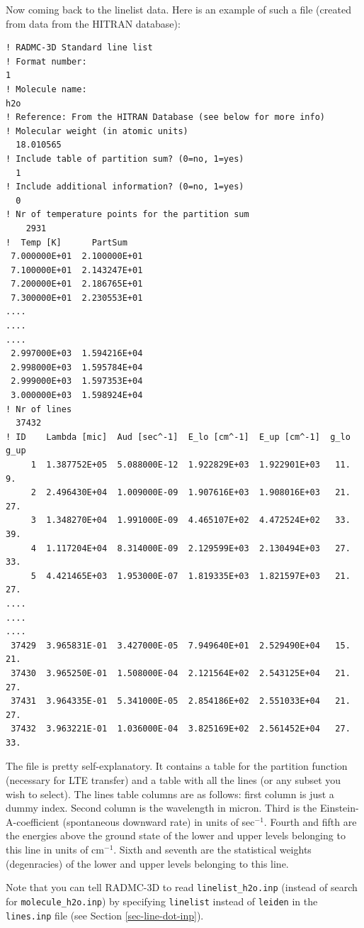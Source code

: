 \documentclass{report}
\newenvironment{asciibox}%
  {\begin{list}{}{%
    \setlength{\topsep}{0.5em}%
    \setlength{\parskip}{0em}%
    \setlength{\parsep}{0em}%
    \setlength{\itemsep}{0em}%
    \setlength{\rightmargin}{0em}%
    \setlength{\leftmargin}{3.0em}%
    \setlength{\labelsep}{1em}%
    \setlength{\labelwidth}{2em}%
  }\normalfont\footnotesize\item}
  {\end{list}}
\begin{document}
Now coming back to the linelist data. Here is an example of such a file
(created from data from the HITRAN database):
\begin{asciibox}\begin{verbatim}
! RADMC-3D Standard line list
! Format number:
1
! Molecule name:
h2o
! Reference: From the HITRAN Database (see below for more info)
! Molecular weight (in atomic units)
  18.010565
! Include table of partition sum? (0=no, 1=yes)
  1
! Include additional information? (0=no, 1=yes)
  0
! Nr of temperature points for the partition sum
    2931
!  Temp [K]      PartSum
 7.000000E+01  2.100000E+01
 7.100000E+01  2.143247E+01
 7.200000E+01  2.186765E+01
 7.300000E+01  2.230553E+01
....
....
....
 2.997000E+03  1.594216E+04
 2.998000E+03  1.595784E+04
 2.999000E+03  1.597353E+04
 3.000000E+03  1.598924E+04
! Nr of lines
  37432
! ID    Lambda [mic]  Aud [sec^-1]  E_lo [cm^-1]  E_up [cm^-1]  g_lo  g_up   
     1  1.387752E+05  5.088000E-12  1.922829E+03  1.922901E+03   11.    9.   
     2  2.496430E+04  1.009000E-09  1.907616E+03  1.908016E+03   21.   27.   
     3  1.348270E+04  1.991000E-09  4.465107E+02  4.472524E+02   33.   39.   
     4  1.117204E+04  8.314000E-09  2.129599E+03  2.130494E+03   27.   33.   
     5  4.421465E+03  1.953000E-07  1.819335E+03  1.821597E+03   21.   27.   
....
....
....
 37429  3.965831E-01  3.427000E-05  7.949640E+01  2.529490E+04   15.   21.   
 37430  3.965250E-01  1.508000E-04  2.121564E+02  2.543125E+04   21.   27.   
 37431  3.964335E-01  5.341000E-05  2.854186E+02  2.551033E+04   21.   27.   
 37432  3.963221E-01  1.036000E-04  3.825169E+02  2.561452E+04   27.   33.   
\end{verbatim}\end{asciibox}
The file is pretty self-explanatory. It contains a table for the partition
function (necessary for LTE transfer) and a table with all the lines (or any
subset you wish to select). The lines table columns are as follows: first
column is just a dummy index. Second column is the wavelength in
micron. Third is the Einstein-A-coefficient (spontaneous downward rate) in
units of sec$^{-1}$. Fourth and fifth are the energies above the ground
state of the lower and upper levels belonging to this line in units of
cm$^{-1}$. Sixth and seventh are the statistical weights (degenracies) of
the lower and upper levels belonging to this line.

Note that you can tell RADMC-3D to read {\small\tt linelist\_h2o.inp}
(instead of search for {\small\tt molecule\_h2o.inp}) by specifying
{\small\tt linelist} instead of {\small\tt leiden} in the 
{\small\tt lines.inp} file (see Section \ref{sec-line-dot-inp}).
\end{document}

